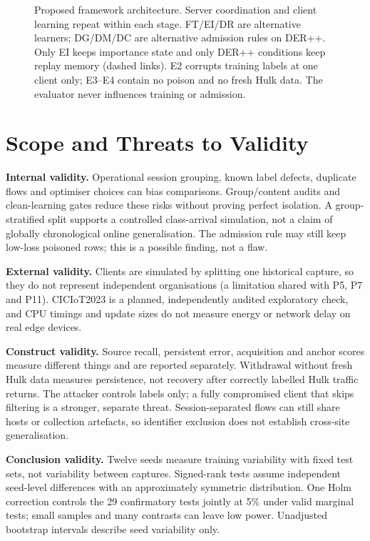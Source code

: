 \documentclass[10pt,a4paper]{article}
\begin{document}
\begin{figure}[H]
{
}
\caption{Proposed framework architecture. Server coordination and client learning repeat within each stage. FT/EI/DR are alternative learners; DG/DM/DC are alternative admission rules on DER++. Only EI keeps importance state and only DER++ conditions keep replay memory (dashed links). E2 corrupts training labels at one client only; E3--E4 contain no poison and no fresh Hulk data. The evaluator never influences training or admission.}
\label{fig:framework}
\end{figure}

\section{Scope and Threats to Validity}
\textbf{Internal validity.} Operational session grouping, known label defects, duplicate flows and optimiser choices can bias comparisons. Group/content audits and clean-learning gates reduce these risks without proving perfect isolation. A group-stratified split supports a controlled class-arrival simulation, not a claim of globally chronological online generalisation. The admission rule may still keep low-loss poisoned rows; this is a possible finding, not a flaw.

\textbf{External validity.} Clients are simulated by splitting one historical capture, so they do not represent independent organisations (a limitation shared with P5, P7 and P11). CICIoT2023 is a planned, independently audited exploratory check, and CPU timings and update sizes do not measure energy or network delay on real edge devices.

\textbf{Construct validity.} Source recall, persistent error, acquisition and anchor scores measure different things and are reported separately. Withdrawal without fresh Hulk data measures persistence, not recovery after correctly labelled Hulk traffic returns. The attacker controls labels only; a fully compromised client that skips filtering is a stronger, separate threat. Session-separated flows can still share hosts or collection artefacts, so identifier exclusion does not establish cross-site generalisation.

\textbf{Conclusion validity.} Twelve seeds measure training variability with fixed test sets, not variability between captures. Signed-rank tests assume independent seed-level differences with an approximately symmetric distribution. One Holm correction controls the 29 confirmatory tests jointly at 5\% under valid marginal tests; small samples and many contrasts can leave low power. Unadjusted bootstrap intervals describe seed variability only.
\end{document}
